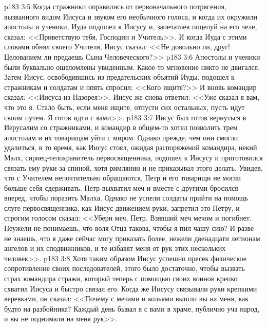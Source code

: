 \vs p183 3:5 Когда стражники оправились от первоначального потрясения, вызванного видом Иисуса и звуком его необычного голоса, и когда их окружили апостолы и ученики, Иуда подошел к Иисусу и, запечатлев поцелуй на его челе, сказал: <<Приветствую тебя, Господин и Учитель>>. И когда Иуда с этими словами обнял своего Учителя, Иисус сказал: <<Не довольно ли, друг! Целованием ли предаешь Сына Человеческого?>>
\vs p183 3:6 Апостолы и ученики были буквально ошеломлены увиденным. Какое\hyp{}то мгновение никто не двигался. Затем Иисус, освободившись из предательских объятий Иуды, подошел к стражникам и солдатам и опять спросил: <<Кого ищите?>> И вновь командир сказал: <<Иисуса из Назорея>>. Иисус же снова ответил: <<Уже сказал я вам, что это я. Стало быть, если меня ищите, отпусти сих остальных, пусть идут своим путем. Я готов идти с вами>>.
\vs p183 3:7 Иисус был готов вернуться в Иерусалим со стражниками, и командир в общем\hyp{}то хотел позволить трем апостолам и их товарищам уйти с миром. Однако прежде, чем они смогли удалиться, в то время, как Иисус стоял, ожидая распоряжений командира, некий Малх, сириец\hyp{}телохранитель первосвященника, подошел к Иисусу и приготовился связать ему руки за спиной, хотя римлянин и не приказывал этого делать. Увидев, что с Учителем непочтительно обращаются, Петр и его товарищи не могли больше себя сдерживать. Петр выхватил меч и вместе с другими бросился вперед, чтобы поразить Малха. Однако не успели солдаты прийти на помощь слуге первосвященника, как Иисус движением руки, запретил это Петру, и строгим голосом сказал: <<Убери меч, Петр. Взявший меч мечом и погибнет. Неужели не понимаешь, что воля Отца такова, чтобы я пил чашу сию? И разве не знаешь, что я даже сейчас могу приказать более, нежели двенадцати легионам ангелов и их сподвижников, и те избавят меня от рук этих нескольких человек>>.
\vs p183 3:8 Хотя таким образом Иисус успешно пресек физическое сопротивление своих последователей, этого было достаточно, чтобы вызвать страх командира стражи, который теперь с помощью своих воинов крепко схватил Иисуса и быстро связал его. Когда же Иисусу связывали руки крепкими веревками, он сказал: <<Почему с мечами и кольями вышли вы на меня, как будто на разбойника? Каждый день бывал я с вами в храме, публично уча народ, и вы не поднимали на меня рук>>.
